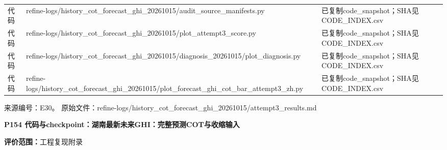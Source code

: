 \documentclass[UTF8,a4paper,landscape,10pt]{ctexart}
\begin{document}
\begin{center}
\begin{adjustbox}{max totalheight=0.58\textheight,max width=\linewidth}
\begin{minipage}{\linewidth}
\begin{tabularx}{\linewidth}{>{\hsize=0.3500\hsize\raggedright\arraybackslash}X>{\hsize=1.9000\hsize\raggedright\arraybackslash}X>{\hsize=0.7500\hsize\raggedright\arraybackslash}X}
代码 & refine-logs/\allowbreak{}history\_\allowbreak{}cot\_\allowbreak{}forecast\_\allowbreak{}ghi\_\allowbreak{}20261015/\allowbreak{}audit\_\allowbreak{}source\_\allowbreak{}manifests.py & 已复制code\_\allowbreak{}snapshot；SHA见CODE\_\allowbreak{}INDEX.csv \\
代码 & refine-logs/\allowbreak{}history\_\allowbreak{}cot\_\allowbreak{}forecast\_\allowbreak{}ghi\_\allowbreak{}20261015/\allowbreak{}plot\_\allowbreak{}attempt3\_\allowbreak{}score.py & 已复制code\_\allowbreak{}snapshot；SHA见CODE\_\allowbreak{}INDEX.csv \\
代码 & refine-logs/\allowbreak{}history\_\allowbreak{}cot\_\allowbreak{}forecast\_\allowbreak{}ghi\_\allowbreak{}20261015/\allowbreak{}diagnosis\_\allowbreak{}20261015/\allowbreak{}plot\_\allowbreak{}diagnosis.py & 已复制code\_\allowbreak{}snapshot；SHA见CODE\_\allowbreak{}INDEX.csv \\
代码 & refine-logs/\allowbreak{}history\_\allowbreak{}cot\_\allowbreak{}forecast\_\allowbreak{}ghi\_\allowbreak{}20261015/\allowbreak{}plot\_\allowbreak{}forecast\_\allowbreak{}ghi\_\allowbreak{}cot\_\allowbreak{}bar\_\allowbreak{}attempt3\_\allowbreak{}zh.py & 已复制code\_\allowbreak{}snapshot；SHA见CODE\_\allowbreak{}INDEX.csv \\
\bottomrule\end{tabularx}\end{minipage}\end{adjustbox}\end{center}
\vfill{\scriptsize\color{muted} 来源编号：E30。 原始文件：refine-logs/\allowbreak{}history\_\allowbreak{}cot\_\allowbreak{}forecast\_\allowbreak{}ghi\_\allowbreak{}20261015/\allowbreak{}attempt3\_\allowbreak{}results.md}\par
\clearpage
{\large\bfseries\color{ink} P154  代码与checkpoint：湖南最新未来GHI：完整预测COT与收缩输入}\par
{}\par
{\small\color{muted}\textbf{评价范围：}工程复现附录}\par\vspace{3mm}
\end{document}
